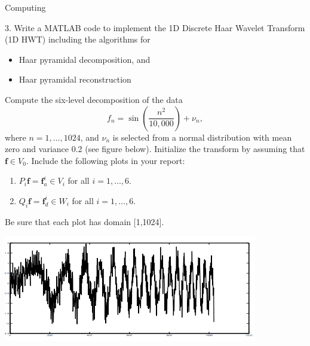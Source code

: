\begin{section}{Computing}
\begin{homeworkSection}{3. }
Write a \textsc{MATLAB} code to implement the 1D Discrete Haar Wavelet Transform (1D HWT) including the algorithms for
\begin{itemize}
	\item Haar pyramidal decomposition, and
	\item Haar pyramidal reconstruction
\end{itemize}
Compute the six-level decomposition of the data
$$ f_n = \sin \left ( \frac{n^2}{10,000} \right ) + \nu_n, $$
where $n = 1,\ldots,1024$, and $\nu_n$ is  selected from a normal distribution with mean zero and variance 0.2 (see figure below). Initialize the transform by assuming that $\bm{f} \in V_0$. Include the following plots in your report:
\renewcommand{\theenumi}{\alph{enumi}}
\begin{enumerate}
	\item $P_i \bm{f} = \bm{f}^i_a \in V_i$ for all $i = 1, \ldots, 6$.
	\item $Q_i \bm{f} = \bm{f}^i_d \in W_i$ for all $i = 1, \ldots, 6$.
\end{enumerate}
Be sure that each plot has domain [1,1024].
\\
\begin{center}
\begin{minipage}{0.5\textwidth}
    \includegraphics[trim={0cm 0cm 0cm 0cm},clip,width=1.0\columnwidth]{tmp}
\end{minipage}
\end{center}
\end{homeworkSection}


\end{section}
